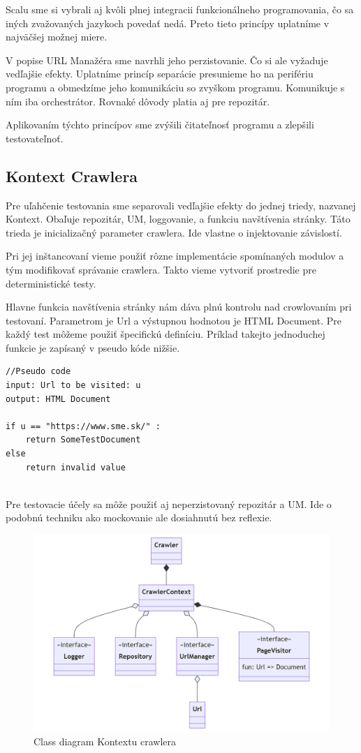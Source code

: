 Scalu sme si vybrali aj kvôli plnej integracii funkcionálneho programovania, čo sa iných zvažovaných jazykoch povedať nedá. Preto tieto princípy uplatníme v najväčšej možnej miere. 

V popise URL Manažéra sme navrhli jeho perzistovanie. Čo si ale vyžaduje vedľajšie efekty. Uplatníme princíp separácie presunieme ho na perifériu programu a obmedzíme jeho komunikáciu so zvyškom programu. Komunikuje s ním iba orchestrátor.  Rovnaké dôvody platia aj pre repozitár. 

Aplikovaním týchto princípov sme zvýšili čitateľnosť programu a zlepšili testovateľnoť.  

\subsection{Kontext Crawlera}
Pre uľahčenie testovania sme separovali vedľajšie efekty do jednej triedy, nazvanej Kontext. Obaľuje repozitár, UM, loggovanie, a funkciu navštívenia stránky. Táto trieda je inicializačný parameter crawlera. Ide vlastne o injektovanie závislostí. 

Pri jej inštancovaní vieme použiť rôzne implementácie spomínaných modulov a tým modifikovať správanie crawlera. Takto vieme vytvoriť prostredie pre deterministické testy. 

Hlavne funkcia navštívenia stránky nám dáva plnú kontrolu nad crowlovaním pri testovaní. Parametrom je Url a výstupnou hodnotou je HTML Document. Pre každý test môžeme použiť špecifickú definíciu. Príklad takejto jednoduchej funkcie je zapísaný v pseudo kóde nižšie.

\begin{lstlisting}
//Pseudo code
input: Url to be visited: u
output: HTML Document

if u == "https://www.sme.sk/" :
    return SomeTestDocument
else 
    return invalid value


\end{lstlisting}


Pre testovacie účely sa môže použiť aj neperzistovaný repozitár a UM. Ide o podobnú techniku ako mockovanie ale dosiahnutú bez reflexie. 

\begin{figure}[!ht]
    \centering
    \includegraphics[width=.9\textwidth]{figures/classDiagramContext.png}
    \caption{ Class diagram Kontextu crawlera \label{o:classDiagramContext}}
\end{figure}